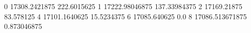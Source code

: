 0 17308.2421875 222.6015625
1 17222.98046875 137.33984375
2 17169.21875 83.578125
4 17101.1640625 15.5234375
6 17085.640625 0.0
8 17086.513671875 0.873046875
